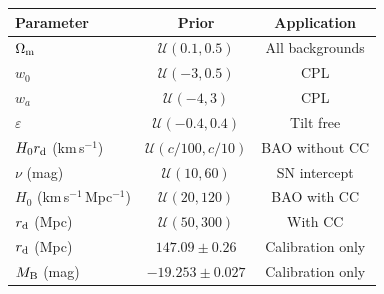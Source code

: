 \begin{tabular}{lcc}
\hline\hline
Parameter & Prior & Application \\
\hline
$\Omega_{\rm m}$ & $\mathcal{U}(0.1, 0.5)$ & All backgrounds \\
$w_0$ & $\mathcal{U}(-3, 0.5)$ & CPL \\
$w_a$ & $\mathcal{U}(-4, 3)$ & CPL \\
$\varepsilon$ & $\mathcal{U}(-0.4, 0.4)$ & Tilt free \\
$H_0r_{\rm d}$ (km\,s$^{-1}$) & $\mathcal{U}(c/100, c/10)$ & BAO without CC \\
$\nu$ (mag) & $\mathcal{U}(10, 60)$ & SN intercept \\
$H_0$ (km\,s$^{-1}$\,Mpc$^{-1}$) & $\mathcal{U}(20, 120)$ & BAO with CC \\
$r_{\rm d}$ (Mpc) & $\mathcal{U}(50, 300)$ & With CC \\
\hline
$r_{\rm d}$ (Mpc) & $147.09 \pm 0.26$ & Calibration only \\
$M_{\rm B}$ (mag) & $-19.253 \pm 0.027$ & Calibration only \\
\hline\hline
\end{tabular}
